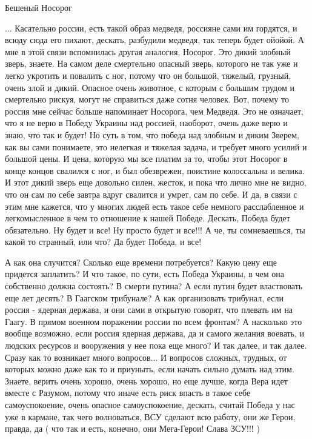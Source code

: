  
 
 
 
 

Бешеный Носорог

... Касательно россии, есть такой образ медведя, россияне сами им гордятся, и
всюду сюда его пихают, дескать, разбудили медведя, так теперь будет ойойой.  А
мне в этой связи вспомнилась другая аналогия, Носорог. Это дикий злобный зверь,
знаете.  На самом деле смертельно опасный зверь, которого не так уже и легко
укротить и повалить с ног, потому что он большой, тяжелый, грузный, очень злой
и дикий. Опасное очень животное, с которым с большим трудом и смертельно
рискуя, могут не справиться даже сотня человек.  Вот, почему то россия мне
сейчас больше напоминает Носорога, чем Медведя. Это не означает, что я не верю
в Победу Украины над россией, наоборот, очень даже верю и знаю, что так и
будет!  Но суть в том, что победа над злобным и диким Зверем, как вы сами
понимаете, это нелегкая и тяжелая задача, и требует много усилий и большой
цены. И цена, которую мы все платим за то, чтобы этот Носорог в конце концов
свалился с ног, и был обезврежен, поистине колоссальна и велика. И этот дикий
зверь еще довольно силен, жесток, и пока что лично мне не видно, что он сам по
себе завтра вдруг свалится и умрет, сам по себе.  И да, в связи с этим мне
кажется, что у многих людей есть такое себе немного расслабленное и
легкомысленное в чем то отношение к нашей Победе.  Дескать, Победа будет
обязательно. Ну будет и все! Ну просто будет и все!!! А че, ты сомневаешься, ты
какой то странный, или что? Да будет Победа, и все!

А как она случится? Сколько еще времени потребуется?  Какую цену еще придется
заплатить? И что такое, по сути, есть Победа Украины, в чем она собственно
должна состоять?  В смерти путина? А если путин будет властвовать еще лет
десять? В Гаагском трибунале? А как организовать трибунал, если россия -
ядерная держава, и они сами в открытую говорят, что плевать им на Гаагу. В
прямом военном поражении россии по всем фронтам? А насколько это вообще
возможно, если россия ядерная держава, да и самого желания воевать, и людских
ресурсов и вооружения у нее пока еще много?  И так далее, и так далее. Сразу
как то возникает много вопросов...  И вопросов сложных, трудных, от которых
можно даже как то и приуныть, если начать сильно думать над этим. Знаете,
верить очень хорошо, очень хорошо, но еще лучше, когда Вера идет вместе с
Разумом, потому что иначе есть риск впасть в такое себе самоуспокоение, очень
опасное самоуспокоение, дескать, считай Победа у нас уже в кармане, так чего
волноваться, ВСУ сделают всю работу, они же Герои, правда, да ( что так и есть,
конечно, они Мега-Герои! Слава ЗСУ!!! )

